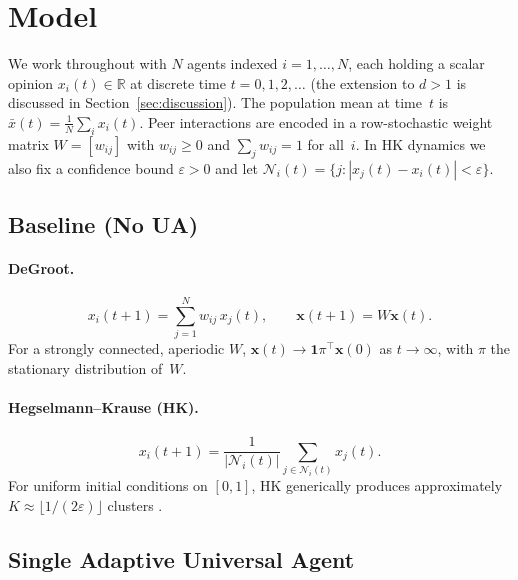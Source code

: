 \documentclass{article}
\theoremstyle{plain}
\theoremstyle{definition}
\theoremstyle{remark}
\newcommand{\bx}{\mathbf{x}}
\newcommand{\bone}{\mathbf{1}}
\newcommand{\xbar}{\bar{x}}
\newcommand{\Ni}{\mathcal{N}_i}
\begin{document}
\section{Model}
\label{sec:model}

We work throughout with $N$ agents indexed $i=1,\ldots,N$, each
holding a scalar opinion $x_i(t)\in\mathbb{R}$ at discrete time
$t=0,1,2,\ldots$ (the extension to $d>1$ is discussed in
Section~\ref{sec:discussion}).  The population mean at time~$t$ is
$\xbar(t)=\frac{1}{N}\sum_i x_i(t)$.  Peer interactions are encoded
in a row-stochastic weight matrix $W=[w_{ij}]$ with $w_{ij}\geq 0$
and $\sum_j w_{ij}=1$ for all~$i$.  In HK dynamics we also fix a
confidence bound $\varepsilon>0$ and let
$\Ni(t)=\{j:|x_j(t)-x_i(t)|<\varepsilon\}$.

\subsection{Baseline (No UA)}

\paragraph{DeGroot.}
\begin{equation}
    x_i(t+1) = \sum_{j=1}^{N} w_{ij}\,x_j(t),
    \qquad \bx(t+1) = W\bx(t).
    \label{eq:degroot}
\end{equation}
For a strongly connected, aperiodic $W$,
$\bx(t)\to\bone\pi^\top\bx(0)$ as $t\to\infty$, with $\pi$ the
stationary distribution of~$W$.

\paragraph{Hegselmann--Krause (HK).}
\begin{equation}
    x_i(t+1) = \frac{1}{|\Ni(t)|}\sum_{j\in\Ni(t)} x_j(t).
    \label{eq:hk}
\end{equation}
For uniform initial conditions on $[0,1]$, HK generically produces
approximately $K\approx\lfloor 1/(2\varepsilon)\rfloor$ clusters
\citep{hegselmann2002,lorenz2007}.

\subsection{Single Adaptive Universal Agent}
\label{subsec:single-ua}
\end{document}
